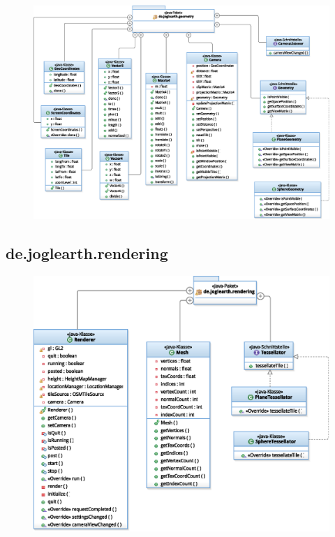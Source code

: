\documentclass[10pt]{scrreprt}
\begin{document}
\begin{figure}[!htb]
\begin{center}
	\includegraphics[scale=0.55]{de_joglearth_geometry.eps}
\end{center}
\end{figure}

\newpage

\subsection*{de.joglearth.rendering}

\begin{figure}[!htb]
\begin{center}
	\includegraphics[scale=0.55]{de_joglearth_rendering.eps}
\end{center}
\end{figure}
\end{document}
